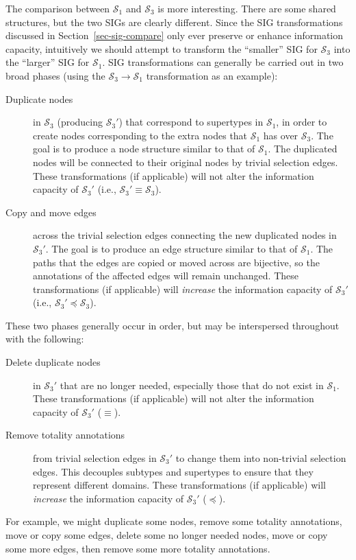 \documentclass{sig-alternate-05-2015}
\newcommand{\SC}[1]{\ensuremath{\mathcal{S}_{#1}}}
\begin{document}
The comparison between \(\SC{1}\) and \(\SC{3}\) is more interesting. There are some shared structures, but the two SIGs are clearly different. Since the SIG transformations discussed in Section~\ref{sec-sig-compare} only ever preserve or enhance information capacity, intuitively we should attempt to transform the ``smaller'' SIG for \(\SC{3}\) into the ``larger'' SIG for \(\SC{1}\). SIG transformations can generally be carried out in two broad phases (using the \(\SC{3} \rightarrow \SC{1}\) transformation as an example):
\begin{description}

    \item[Duplicate nodes] in \(\SC{3}\) (producing \(\SC{3}'\)) that correspond to supertypes in \(\SC{1}\), in order to create nodes corresponding to the extra nodes that \(\SC{1}\) has over \(\SC{3}\). The goal is to produce a node structure similar to that of \(\SC{1}\). The duplicated nodes will be connected to their original nodes by trivial selection edges. These transformations (if applicable) will not alter the information capacity of \(\SC{3}'\) (i.e., \(\SC{3}' \equiv \SC{3}\)).
    
    \item[Copy and move edges] across the trivial selection edges connecting the new duplicated nodes in \(\SC{3}'\). The goal is to produce an edge structure similar to that of \(\SC{1}\). The paths that the edges are copied or moved across are bijective, so the annotations of the affected edges will remain unchanged. These transformations (if applicable) will \emph{increase} the information capacity of \(\SC{3}'\) (i.e., \(\SC{3}' \preceq \SC{3}\)).
    
\end{description}

These two phases generally occur in order, but may be interspersed throughout with the following:
\begin{description}

    \item[Delete duplicate nodes] in \(\SC{3}'\) that are no longer needed, especially those that do not exist in \(\SC{1}\). These transformations (if applicable) will not alter the information capacity of \(\SC{3}'\) (\(\equiv\)).
    
    \item[Remove totality annotations] from trivial selection edges in \(\SC{3}'\) to change them into non-trivial selection edges. This decouples subtypes and supertypes to ensure that they represent different domains. These transformations (if applicable) will \emph{increase} the information capacity of \(\SC{3}'\) (\(\preceq\)).
    
\end{description}
For example, we might duplicate some nodes, remove some totality annotations, move or copy some edges, delete some no longer needed nodes, move or copy some more edges, then remove some more totality annotations.
\end{document}

